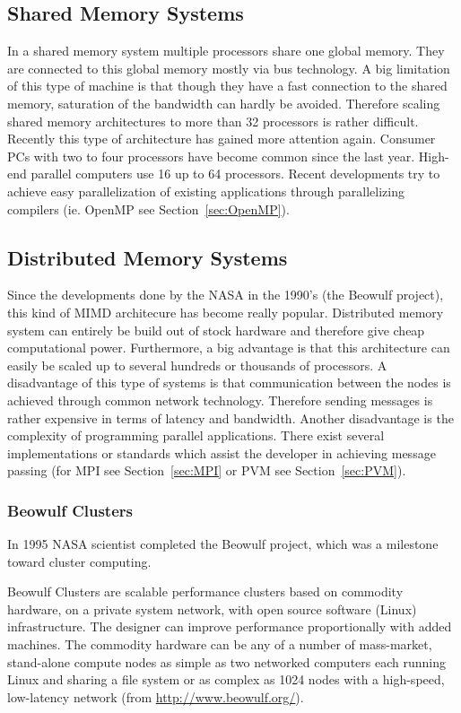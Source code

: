 \subsection{Shared Memory Systems}
\label{sec:sharedmemorysystems}
In a shared memory system multiple processors share one global
memory. They are connected to this global memory mostly via bus
technology. A big limitation of this type of machine is that though they have
a fast connection to the shared memory, saturation of the bandwidth can
hardly be avoided. Therefore scaling shared memory architectures to
more than 32 processors is rather difficult. Recently this type of
architecture has gained more attention again. Consumer PCs with two to four
processors have become common since the last year. High-end parallel
computers use 16 up to 64 processors. Recent developments try to
achieve easy parallelization of existing applications through
parallelizing compilers (ie. OpenMP see Section~\ref{sec:OpenMP}).

\subsection{Distributed Memory Systems}
\label{sec:distributedmemorysystems}
Since the developments done by the NASA in the 1990's (the Beowulf project),
this kind of MIMD architecure has become really popular.
Distributed memory system can
entirely be build out of stock hardware and therefore give cheap
computational power. Furthermore, a big advantage is that this
architecture can easily be scaled up to several hundreds or thousands
of processors. A disadvantage of this type of systems is that
communication between the nodes is achieved through common network
technology. Therefore sending messages is rather expensive in terms of
latency and bandwidth. Another disadvantage is the complexity of
programming parallel applications. There exist several implementations
or standards which assist the developer in achieving message passing
(for MPI see Section~\ref{sec:MPI} or PVM see Section~\ref{sec:PVM}).

\subsubsection{Beowulf Clusters}
In 1995 NASA scientist completed the Beowulf project, which was a
milestone toward cluster computing.

Beowulf Clusters are scalable performance clusters based on commodity
hardware, on a private system network, with open source software
(Linux) infrastructure. The designer can improve performance
proportionally with added machines. The commodity hardware can be any
of a number of mass-market, stand-alone compute nodes as simple as two
networked computers each running Linux and sharing a file system or as
complex as 1024 nodes with a high-speed, low-latency network (from
\url{http://www.beowulf.org/}).

